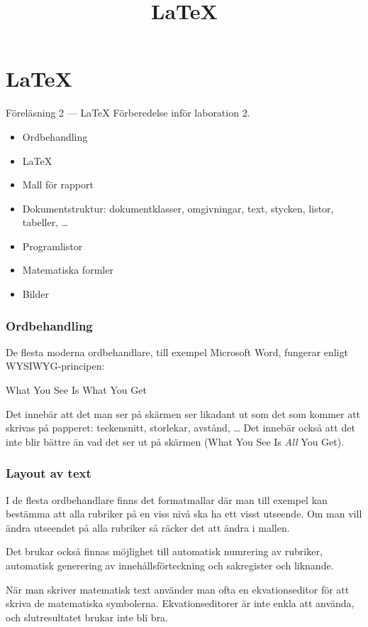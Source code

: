 
\title{\LaTeX}
\section{\LaTeX}

\begin{frame}[fragile=singleslide]
\label{latex}
\begin{block}{\centering\Large Föreläsning 2 --- \LaTeX}
Förberedelse inför laboration 2.

\begin{itemize}
\item Ordbehandling
\item \LaTeX
\item Mall för rapport
\item Dokumentstruktur: dokumentklasser, omgivningar, text, stycken, listor, tabeller, \ldots
\item Programlistor
\item Matematiska formler
\item Bilder
\end{itemize}
\end{block}
\end{frame} 

\begin{frame}[fragile=singleslide]
\frametitle{Ordbehandling}
De flesta moderna ordbehandlare, till exempel Microsoft Word,  fungerar 
enligt \textsc{WYSIWYG}-principen:

\blankline
\begin{center}
What You See Is What You Get
\end{center}

\blankline
Det innebär att det man ser på skärmen ser likadant ut som
det som kommer
att skrivas på papperet: teckensnitt, storlekar, avstånd, \ldots
Det innebär också att det inte blir bättre än vad det ser ut
på skärmen (What You See Is \emph{All} You Get).
\end{frame} 

\begin{frame}[fragile=singleslide]
\frametitle{Layout av text}
I de flesta ordbehandlare finns det
formatmallar där man till exempel kan bestämma att alla rubriker på
en viss nivå ska ha ett visst utseende. Om man vill ändra
utseendet på alla rubriker så räcker det att ändra i mallen.

\blankline
Det brukar också finnas möjlighet till automatisk numrering av 
rubriker, automatisk generering av innehållsförteckning och 
sakregister och liknande. 

\blankline
När man skriver matematisk text använder man ofta en ekvationseditor
för att skriva de matematiska symbolerna. Ekvationseditorer är inte
enkla att använda, och slutresultatet brukar inte bli bra.
\end{frame} 

